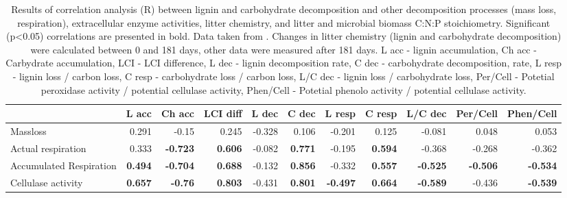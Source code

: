 \documentclass[10pt]{article}
\begin{document}
\begin{flushleft}
\newpage



\newpage




\begin{landscape}

\begin{table}[h!]
\begin{center}
\caption{Results of correlation analysis (R) between lignin and carbohydrate decomposition and other decomposition processes (mass loss, respiration), extracellular enzyme activities, litter chemistry, and litter and microbial biomass C:N:P stoichiometry. Significant (p\textless 0.05) correlations are presented in bold. Data taken from \cite{Mooshammer2011, Leitner2011}. Changes in litter chemistry (lignin and carbohydrate decomposition) were calculated between 0 and 181 days, other data were measured after 181 days. L acc - lignin accumulation, Ch acc - Carbydrate accumulation, LCI - LCI difference, L dec - lignin decomposition rate, C dec - carbohydrate decomposition,  rate, L resp - lignin loss / carbon loss, C resp - carbohydrate loss / carbon loss, L/C dec - lignin loss / carbohydrate loss, Per/Cell - Potetial peroxidase activity / potential cellulase activity, Phen/Cell - Potetial phenolo activity / potential cellulase activity.}
\label{corrtable}
{\small
\begin{tabular}{lrrrrrrrrrr}
  \hline
 & L acc & Ch acc & LCI diff & L dec & C dec & L resp & C resp & L/C dec & Per/Cell & Phen/Cell \\ 
  \hline
Massloss & 0.291 & -0.15 & 0.245 & -0.328 & 0.106 & -0.201 & 0.125 & -0.081 & 0.048 & 0.053 \\ 
  Actual respiration & 0.333 & \textbf{-0.723} & \textbf{0.606} & -0.082 & \textbf{0.771} & -0.195 & \textbf{0.594} & -0.368 & -0.268 & -0.362 \\ 
  Accumulated Respiration & \textbf{0.494} & \textbf{-0.704} & \textbf{0.688} & -0.132 & \textbf{0.856} & -0.332 & \textbf{0.557} & \textbf{-0.525} & \textbf{-0.506} & \textbf{-0.534} \\ 
  Cellulase activity & \textbf{0.657} & \textbf{-0.76} & \textbf{0.803} & -0.431 & \textbf{0.801} & \textbf{-0.497} & \textbf{0.664} & \textbf{-0.589} & -0.436 & \textbf{-0.539} \\ 

\end{tabular}}
\end{center}
\end{table}
\end{landscape}
\end{flushleft}
\end{document}
